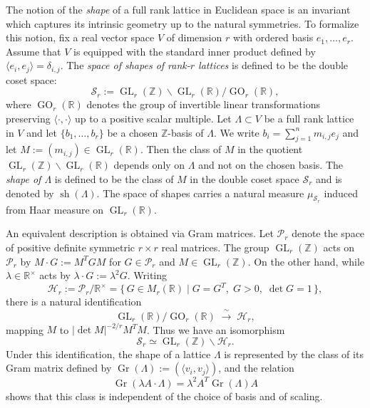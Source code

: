 \documentclass[table]{amsart}
\newcommand{\Z}{\mathbb{Z}}
\newcommand{\op}[1]{\operatorname{#1}}
\numberwithin{equation}{section}
\begin{document}
The notion of the \emph{shape} of a full rank lattice in Euclidean space is an invariant which captures its intrinsic geometry up to the natural symmetries. To formalize this notion, fix a real vector space $V$ of dimension $r$ with ordered basis $e_1, \dots, e_r$. Assume that $V$ is equipped with the standard inner product defined by $\langle e_i, e_j\rangle =\delta_{i,j}$. The \emph{space of shapes of rank-$r$ lattices} is defined to be the double coset space:
\[
\mathcal{S}_r := \op{GL}_r(\mathbb{Z}) \backslash \op{GL}_r(\mathbb{R}) / \op{GO}_r(\mathbb{R}),
\]
where $\op{GO}_r(\mathbb{R})$ denotes the group of invertible linear transformations preserving $\langle \cdot, \cdot \rangle$ up to a positive scalar multiple. Let $\Lambda\subset V$ be a full rank lattice in $V$ and let $\{b_1,\dots,b_r\}$ be a chosen $\Z$-basis of $\Lambda$. We write $b_i=\sum_{j=1}^n m_{i,j} e_j$ and let $M:=(m_{i,j})\in\op{GL}_r(\mathbb{R})$. Then the class of $M$ in the quotient $\op{GL}_r(\mathbb{Z}) \backslash \op{GL}_r(\mathbb{R})$ depends only on $\Lambda$ and not on the chosen basis. The \emph{shape of $\Lambda$} is defined to be the class of $M$ in the double coset space $\mathcal{S}_r$ and is denoted by $\op{sh}(\Lambda)$. The space of shapes carries a natural measure $\mu_{\mathcal{S}_r}$ induced from Haar measure on $\op{GL}_r(\mathbb{R})$.

\par An equivalent description is obtained via Gram matrices. Let $\mathcal{P}_r$ denote the space of positive definite symmetric $r\times r$ real matrices. The group $\op{GL}_r(\mathbb{Z})$ acts on $\mathcal{P}_r$ by $M\cdot G :=M^{T} G M$ for $G\in \mathcal{P}_r$ and $M\in \op{GL}_r(\mathbb{Z})$. On the other hand,
while $\lambda\in \mathbb{R}^{\times}$ acts by $\lambda\cdot G:=\lambda^2G$. Writing
\[
\mathcal{H}_r := \mathcal{P}_r / \mathbb{R}^{\times}
 = \{\, G \in M_r(\mathbb{R}) \mid G = G^T,\; G>0,\; \det G = 1 \,\},
\]
there is a natural identification
\[
\op{GL}_r(\mathbb{R}) / \op{GO}_r(\mathbb{R}) \;\xrightarrow{\;\sim\;}\; \mathcal{H}_r,\]
mapping $M$ to $|\det M|^{-2/r} M^T M$. Thus we have an isomorphism
\[
\mathcal{S}_r \simeq \op{GL}_r(\mathbb{Z}) \backslash \mathcal{H}_r.
\]
Under this identification, the shape of a lattice $\Lambda$ is represented by the class of its Gram matrix defined by $\op{Gr}(\Lambda):=\left(\langle v_i, v_j\rangle \right)$, and the relation
\[
\op{Gr}(\lambda A\cdot \Lambda)=\lambda^2 A^T \op{Gr}(\Lambda) A
\]
shows that this class is independent of the choice of basis and of scaling.
\end{document}
